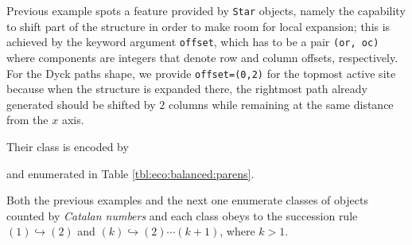 Previous example spots a feature provided by \verb|Star| objects,
namely the capability to shift part of the structure in order to make
room for local expansion; this is achieved by the keyword argument
\verb|offset|, which has to be a pair \verb|(or, oc)| where components
are integers that denote row and column offsets, respectively.
For the Dyck paths shape, we provide \verb|offset=(0,2)| for the topmost
active site because when the structure is expanded there, the rightmost
path already generated should be shifted by $2$ columns while remaining
at the same distance from the $x$ axis.


\begin{example} Their class is encoded by

and enumerated in Table \ref{tbl:eco:balanced:parens}.
\end{example}

Both the previous examples and the next one enumerate classes of objects
counted by \textit{Catalan numbers} and each class obeys to the succession rule
$(1) \hookrightarrow (2)$ and $(k) \hookrightarrow (2)\cdots(k+1)$, where
$k>1$.

